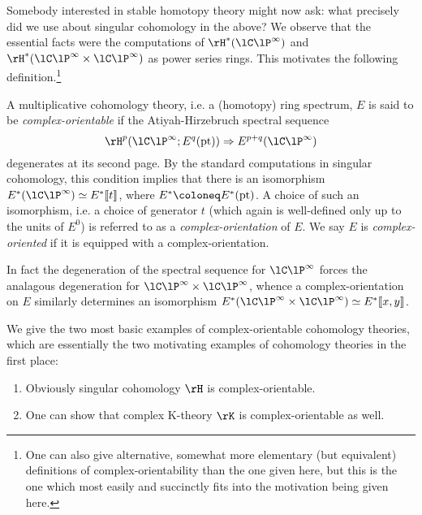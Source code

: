 Somebody interested in stable homotopy theory might now ask: what
precisely did we use about singular cohomology in the above? We
observe that the essential facts were the computations of
$\rH^*(\CP^\infty)$ and $\rH^*(\CP^\infty \times \CP^\infty)$ as power
series rings. This motivates the following definition.\footnote{One
  can also give alternative, somewhat more elementary (but equivalent)
  definitions of complex-orientability than the one given here, but
  this is the one which most easily and succinctly fits into the
  motivation being given here.}

\begin{definition}
  \label{chrom-complor}
  A multiplicative cohomology theory, i.e. a (homotopy) ring spectrum,
  $E$ is said to be \emph{complex-orientable} if the Atiyah-Hirzebruch
  spectral sequence
  \[
  \rH^p(\CP^\infty;E^q(\pt)) \Rightarrow E^{p+q}(\CP^\infty)
  \]
  degenerates at its second page. By the standard computations in
  singular cohomology, this condition implies that there is an
  isomorphism $E^*(\CP^\infty) \iso E^* \ldb t \rdb$, where
  $E^* \ce E^*(\pt)$. A choice of such an isomorphism, i.e. a choice
  of generator $t$ (which again is well-defined only up to the units
  of $E^0$) is referred to as a \emph{complex-orientation} of $E$. We
  say $E$ is \emph{complex-oriented} if it is equipped with a
  complex-orientation.

  In fact the degeneration of the spectral sequence for $\CP^\infty$
  forces the analagous degeneration for
  $\CP^\infty \times \CP^\infty$, whence a complex-orientation on $E$
  similarly determines an isomorphism
  $E^*(\CP^\infty \times \CP^\infty) \iso E^* \ldb x,y \rdb$.
\end{definition}

\begin{examples}
  \label{chrom-coex}
  We give the two most basic examples of complex-orientable cohomology
  theories, which are essentially the two motivating examples of
  cohomology theories in the first place:
  \begin{enumerate}
  \item Obviously singular cohomology $\rH$ is complex-orientable.
  \item One can show that complex K-theory $\rK$ is complex-orientable
    as well.
  \end{enumerate}
\end{examples}

